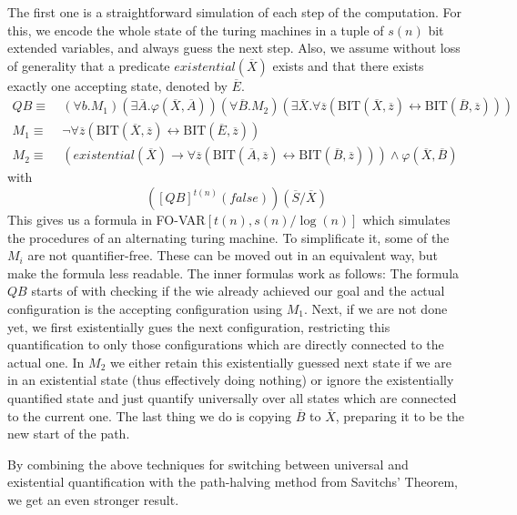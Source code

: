 The first one is a straightforward simulation of each step of the computation.
For this, we encode the whole state of the turing machines in a tuple of $s(n)$ bit extended variables, and always guess the next step.
Also, we assume without loss of generality that a predicate $existential(\overline{X})$ exists and that there exists exactly one accepting state, denoted by $\overline{E}$.
\[
    \begin{aligned}
        QB \equiv~&(\forall b.M_{1})(\exists\overline{A}.\varphi(\overline{X}, \overline{A}))(\forall \overline{B}.M_{2})(\exists \overline{X}. \forall \overline{z}(\text{BIT}(\overline{X}, \overline{z}) \leftrightarrow \text{BIT}(\overline{B}, \overline{z}))) \\
        M_{1} \equiv~&\neg\forall \overline{z}(\text{BIT}(\overline{X}, \overline{z}) \leftrightarrow \text{BIT}(\overline{E}, \overline{z})) \\
        M_{2} \equiv~& (existential(\overline{X}) \to \forall \overline{z}(\text{BIT}(\overline{A}, \overline{z}) \leftrightarrow \text{BIT}(\overline{B}, \overline{z}))) \land \varphi(\overline{X}, \overline{B})
    \end{aligned}
\]
with \[
         \left([QB]^{t(n)}(false)\right)(\overline{S} / \overline{X})
\]
This gives us a formula in FO-VAR$[t(n), s(n)/\log(n)]$ which simulates the procedures of an alternating turing machine.
To simplificate it, some of the $M_i$ are not quantifier-free.
These can be moved out in an equivalent way, but make the formula less readable.
The inner formulas work as follows:
The formula $QB$ starts of with checking if the wie already achieved our goal and the actual configuration is the accepting configuration using $M_1$.
Next, if we are not done yet, we first existentially gues the next configuration, restricting this quantification to only those configurations which are directly connected to the actual one.
In $M_2$ we either retain this existentially guessed next state if we are in an existential state (thus effectively doing nothing) or ignore the existentially quantified state and just quantify universally over all states which are connected to the current one.
The last thing we do is copying $\overline{B}$ to $\overline{X}$, preparing it to be the new start of the path.

By combining the above techniques for switching between universal and existential quantification with the path-halving method from Savitchs' Theorem, we get an even stronger result.

